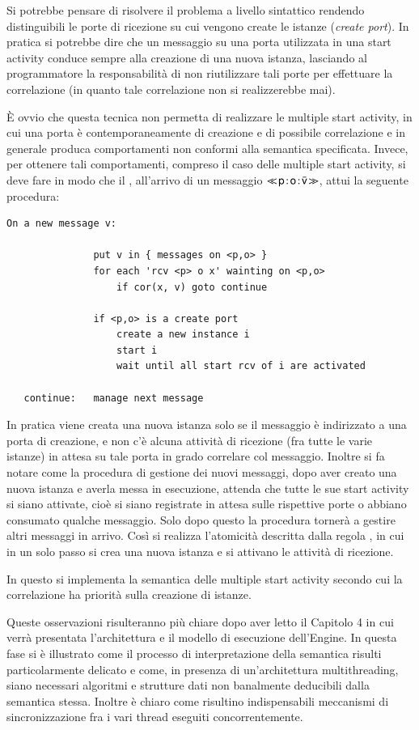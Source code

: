 Si potrebbe pensare di risolvere il problema a livello
sintattico rendendo distinguibili le porte di
ricezione su cui vengono create le istanze (\emph{create port}). In pratica si
potrebbe dire che un messaggio su una porta utilizzata in
una start activity conduce sempre alla creazione di una nuova istanza, lasciando
al programmatore la responsabilità di non riutilizzare tali porte per
effettuare la correlazione (in quanto tale correlazione non si realizzerebbe
mai).

\`E ovvio che questa tecnica non permetta di realizzare le multiple start
activity, in cui una porta è contemporaneamente di creazione e di possibile
correlazione e in generale produca comportamenti non conformi alla semantica
specificata. Invece, per ottenere tali comportamenti, compreso il caso delle
multiple start activity, si deve fare in modo che il ,
all'arrivo di un messaggio $\ll\!{{\sf p}}\! : \! {\sf o}\! : \! \bar{{\sf v}}\!\gg$,  attui la seguente
procedura:
\begin{verbatim}
On a new message v:

               put v in { messages on <p,o> } 
               for each 'rcv <p> o x' wainting on <p,o>
                   if cor(x, v) goto continue

               if <p,o> is a create port 
                   create a new instance i
                   start i
                   wait until all start rcv of i are activated
               
   continue:   manage next message 
\end{verbatim}

In pratica viene creata una nuova istanza solo se il messaggio è indirizzato a
una porta di creazione, e non c'è alcuna attività di ricezione (fra tutte le
varie istanze) in attesa su tale porta in grado correlare col messaggio. Inoltre
si fa notare come la procedura di gestione dei nuovi messaggi, dopo aver creato
una nuova istanza e averla messa in esecuzione, attenda che tutte le sue start
activity si siano attivate, cioè si siano registrate in attesa sulle rispettive
porte o abbiano consumato qualche messaggio. Solo dopo questo la procedura
tornerà a gestire altri messaggi in arrivo. Così si realizza
l'atomicità descritta dalla regola , in cui in un solo passo si
crea una nuova istanza e si attivano le attività di ricezione. 

In questo si implementa la semantica delle multiple start activity secondo cui
la correlazione ha priorità sulla creazione di istanze.

Queste osservazioni risulteranno più chiare dopo aver letto il Capitolo 4 in cui
verrà presentata l'architettura e il modello di esecuzione dell'Engine. In questa
fase si è illustrato come il processo di interpretazione della semantica risulti
particolarmente delicato e come, in presenza di un'architettura multithreading,
siano necessari algoritmi e strutture dati non banalmente deducibili dalla
semantica stessa. Inoltre è chiaro come risultino indispensabili meccanismi di
sincronizzazione fra i vari thread eseguiti concorrentemente.


 



